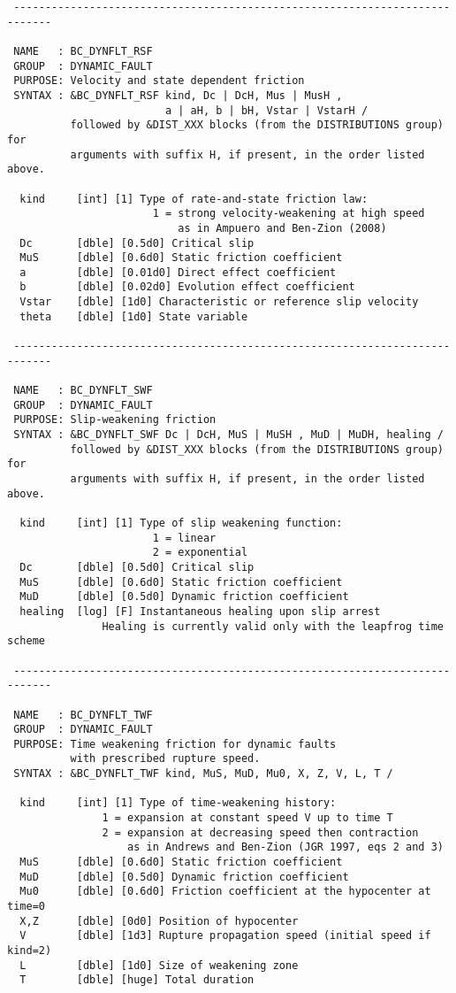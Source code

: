 \begin{verbatim}
 ----------------------------------------------------------------------------

 NAME   : BC_DYNFLT_RSF
 GROUP  : DYNAMIC_FAULT
 PURPOSE: Velocity and state dependent friction
 SYNTAX : &BC_DYNFLT_RSF kind, Dc | DcH, Mus | MusH , 
                         a | aH, b | bH, Vstar | VstarH /
          followed by &DIST_XXX blocks (from the DISTRIBUTIONS group) for
          arguments with suffix H, if present, in the order listed above.

  kind     [int] [1] Type of rate-and-state friction law:
                       1 = strong velocity-weakening at high speed
                           as in Ampuero and Ben-Zion (2008)
  Dc       [dble] [0.5d0] Critical slip 
  MuS      [dble] [0.6d0] Static friction coefficient
  a        [dble] [0.01d0] Direct effect coefficient
  b        [dble] [0.02d0] Evolution effect coefficient
  Vstar    [dble] [1d0] Characteristic or reference slip velocity
  theta    [dble] [1d0] State variable

 ----------------------------------------------------------------------------

 NAME   : BC_DYNFLT_SWF
 GROUP  : DYNAMIC_FAULT
 PURPOSE: Slip-weakening friction
 SYNTAX : &BC_DYNFLT_SWF Dc | DcH, MuS | MuSH , MuD | MuDH, healing /
          followed by &DIST_XXX blocks (from the DISTRIBUTIONS group) for
          arguments with suffix H, if present, in the order listed above.

  kind     [int] [1] Type of slip weakening function:
                       1 = linear
                       2 = exponential
  Dc       [dble] [0.5d0] Critical slip 
  MuS      [dble] [0.6d0] Static friction coefficient
  MuD      [dble] [0.5d0] Dynamic friction coefficient
  healing  [log] [F] Instantaneous healing upon slip arrest
               Healing is currently valid only with the leapfrog time scheme

 ----------------------------------------------------------------------------

 NAME   : BC_DYNFLT_TWF
 GROUP  : DYNAMIC_FAULT
 PURPOSE: Time weakening friction for dynamic faults 
          with prescribed rupture speed.
 SYNTAX : &BC_DYNFLT_TWF kind, MuS, MuD, Mu0, X, Z, V, L, T /

  kind     [int] [1] Type of time-weakening history:
               1 = expansion at constant speed V up to time T
               2 = expansion at decreasing speed then contraction
                   as in Andrews and Ben-Zion (JGR 1997, eqs 2 and 3)
  MuS      [dble] [0.6d0] Static friction coefficient
  MuD      [dble] [0.5d0] Dynamic friction coefficient
  Mu0      [dble] [0.6d0] Friction coefficient at the hypocenter at time=0
  X,Z      [dble] [0d0] Position of hypocenter
  V        [dble] [1d3] Rupture propagation speed (initial speed if kind=2)
  L        [dble] [1d0] Size of weakening zone
  T        [dble] [huge] Total duration


\end{verbatim}

